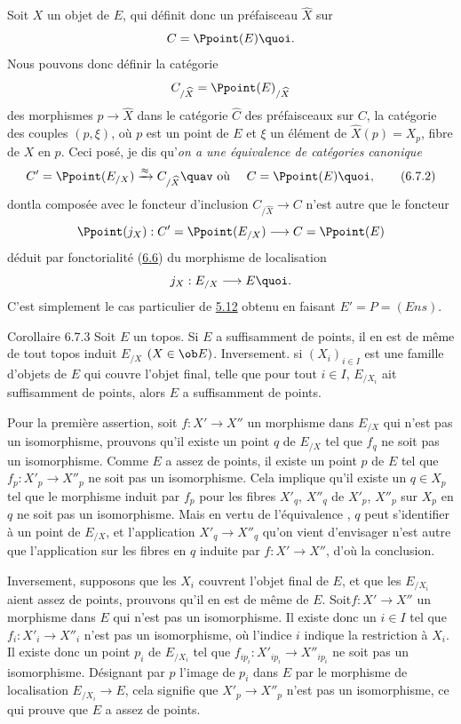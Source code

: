 \documentclass[10pt]{../fichiers-configuration-latex/smfart}
\begin{document}
Soit $X$ un objet de $E$, qui définit donc un préfaisceau
$\widehat{X}$ sur
$$
C=\Ppoint(E){\quoi}.
$$
Nous pouvons donc définir la catégorie
$$
C_{/\widehat{X}}=\Ppoint(E)_{/\widehat{X}}
$$
des morphismes $p\rightarrow \widehat{X}$ dans le catégorie
$\widehat{C}$ des préfaisceaux sur $C$, \ie la catégorie des couples
$(p,\xi)$, où $p$ est un point de $E$ et $\xi$ un élément de
$\widehat{X}(p)=X_p$, fibre de $X$ en $p$. Ceci posé, je dis
qu'\emph{on a une équivalence de catégories canonique}
\begin{equation*}
C'=\Ppoint(E_{/X})\xrightarrow{\approx}C_{/\widehat{X}}\quav \mbox{
où }\quad C=\Ppoint(E){\quoi},\tag{6.7.2}
\end{equation*}
dont\pageoriginale la composée avec le foncteur d'inclusion
$C_{/\widehat{X}}\rightarrow C$ n'est autre que le foncteur
$$
\Ppoint(j_X):C'=\Ppoint(E_{/X})\longrightarrow C=\Ppoint(E)
$$
déduit par fonctorialité (\hyperref[IV.subsec6.6]{6.6}) du morphisme de
localisation 
$$
j_X:E_{/X}\longrightarrow E{\quoi}.
$$
C'est simplement le cas particulier de \hyperref[IV.prop5.12]{5.12} obtenu en
faisant $E'=P=(Ens)$.

\begin{enonce*}{Corollaire 6.7.3}
Soit $E$ un topos. Si $E$ a suffisamment de points, il en est de
même de tout topos induit $E_{/X}$ $(X\in \ob E)$. Inversement. si
$(X_i)_{i\in I}$ est une famille d'objets de $E$ qui couvre l'objet
final, telle que pour tout $i\in I$, $E_{/X_i}$ ait suffisamment de
points, alors $E$ a suffisamment de points.
\end{enonce*}

Pour la première assertion, soit $f:X'\rightarrow X''$ un morphisme
dans $E_{/X}$ qui n'est pas un isomorphisme, prouvons qu'il existe
un point $q$ de $E_{/X}$ tel que $f_q$ ne soit pas un isomorphisme.
Comme $E$ a assez de points, il existe un point $p$ de $E$ tel que
$f_p:X'_p\rightarrow X''_p$ ne soit pas un isomorphisme. Cela
implique qu'il existe un $q\in X_p$ tel que le morphisme induit par
$f_p$ pour les fibres $X'_q$, $X''_q$ de $X'_p$, $X''_p$ sur $X_p$
en $q$ ne soit pas un isomorphisme. Mais en vertu de l'équivalence
, $q$ peut s'identifier à un point de $E_{/X}$, et
l'application $X'_q\rightarrow X''_q$ qu'on vient d'envisager n'est
autre que l'application sur les fibres en $q$ induite par
$f:X'\rightarrow X''$, d'où la conclusion.

Inversement, supposons que les $X_i$ couvrent l'objet final de $E$,
et que les $E_{/X_i}$ aient assez de points, prouvons qu'il en est
de même de $E$. Soit\pageoriginale $f:X'\rightarrow X''$ un
morphisme dans $E$ qui n'est pas un isomorphisme. Il existe donc un
$i\in I$ tel que $f_i:X'_i\rightarrow X''_i$ n'est pas un
isomorphisme, où l'indice $i$ indique la restriction à $X_i$. Il
existe donc un point $p_i$ de $E_{/X_i}$ tel que
$f_{ip_i}:X'_{ip_i}\rightarrow X''_{ip_i}$ ne soit pas un
isomorphisme. Désignant par $p$ l'image de $p_i$ dans $E$ par le
morphisme de localisation $E_{/X_i}\rightarrow E$, cela signifie que
$X'_p\rightarrow X''_p$ n'est pas un isomorphisme, ce qui prouve que
$E$ a assez de points.
\end{document}
